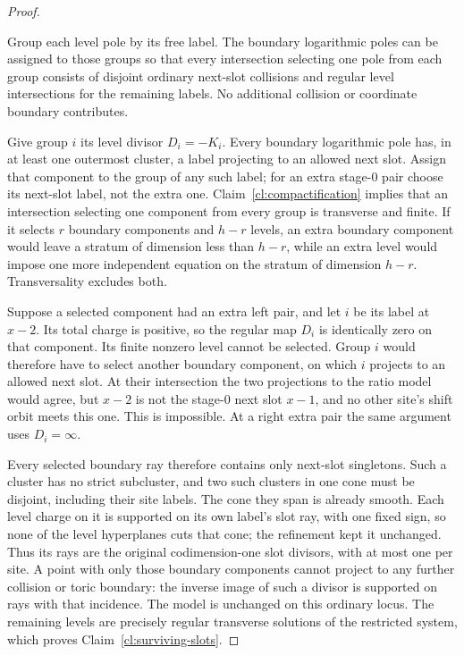 \begin{proof}
\begin{claim}\label{cl:surviving-slots}
Group each level pole by its free label. The boundary logarithmic poles can be assigned to those groups so that every intersection selecting one pole from each group consists of disjoint ordinary next-slot collisions and regular level intersections for the remaining labels. No additional collision or coordinate boundary contributes.
\end{claim}

Give group $i$ its level divisor $D_i=-K_i$. Every boundary logarithmic
pole has, in at least one outermost cluster, a label projecting to an
allowed next slot. Assign that component to the group of any such label;
for an extra stage-$0$ pair choose its next-slot label, not the extra one.
Claim~\ref{cl:compactification} implies that an intersection selecting
one component from every group is transverse and finite. If it selects
$r$ boundary components and $h-r$ levels, an extra boundary component
would leave a stratum of dimension less than $h-r$, while an extra level
would impose one more independent equation on the stratum of dimension
$h-r$. Transversality excludes both.

Suppose a selected component had an extra left pair, and let $i$ be its
label at $x-2$. Its total charge is positive, so the regular map $D_i$
is identically zero on that component. Its finite nonzero level cannot
be selected. Group $i$ would therefore have to select another boundary
component, on which $i$ projects to an allowed next slot. At their
intersection the two projections to the ratio model would agree, but
$x-2$ is not the stage-$0$ next slot $x-1$, and no other site's shift
orbit meets this one. This is impossible. At a right extra pair the
same argument uses $D_i=\infty$.

Every selected boundary ray therefore contains only next-slot
singletons. Such a cluster has no strict subcluster, and two such
clusters in one cone must be disjoint, including their site labels.
The cone they span is already smooth. Each level charge on it is
supported on its own label's slot ray, with one fixed sign, so none of
the level hyperplanes cuts that cone; the refinement kept it unchanged.
Thus its rays are the original codimension-one slot divisors, with at
most one per site. A point with only those boundary components cannot
project to any further collision or toric boundary: the inverse image
of such a divisor is supported on rays with that incidence. The model
is unchanged on this ordinary locus. The remaining levels are precisely
regular transverse solutions of the restricted system, which proves
Claim~\ref{cl:surviving-slots}.


\end{proof}
